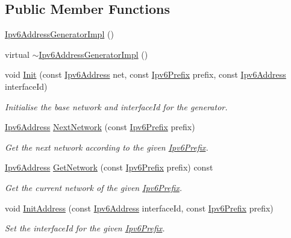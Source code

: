 \subsection*{Public Member Functions}
\begin{DoxyCompactItemize}
\item 
\hyperlink{classns3_1_1Ipv6AddressGeneratorImpl_a5a762f2352c92101ea9ed73d8a069538}{Ipv6\+Address\+Generator\+Impl} ()
\item 
virtual \hyperlink{classns3_1_1Ipv6AddressGeneratorImpl_a3e7f0c5fd87e520f553f9e95f7c546e9}{$\sim$\+Ipv6\+Address\+Generator\+Impl} ()
\item 
void \hyperlink{classns3_1_1Ipv6AddressGeneratorImpl_ac5137550d994e0da6b942210b9836bb6}{Init} (const \hyperlink{classns3_1_1Ipv6Address}{Ipv6\+Address} net, const \hyperlink{classns3_1_1Ipv6Prefix}{Ipv6\+Prefix} prefix, const \hyperlink{classns3_1_1Ipv6Address}{Ipv6\+Address} interface\+Id)
\begin{DoxyCompactList}\small\item\em Initialise the base network and interface\+Id for the generator. \end{DoxyCompactList}\item 
\hyperlink{classns3_1_1Ipv6Address}{Ipv6\+Address} \hyperlink{classns3_1_1Ipv6AddressGeneratorImpl_a9ff78bd07b2d61baa067144e44165dc3}{Next\+Network} (const \hyperlink{classns3_1_1Ipv6Prefix}{Ipv6\+Prefix} prefix)
\begin{DoxyCompactList}\small\item\em Get the next network according to the given \hyperlink{classns3_1_1Ipv6Prefix}{Ipv6\+Prefix}. \end{DoxyCompactList}\item 
\hyperlink{classns3_1_1Ipv6Address}{Ipv6\+Address} \hyperlink{classns3_1_1Ipv6AddressGeneratorImpl_af9484b367b8c08c97436f23a9dd7cd82}{Get\+Network} (const \hyperlink{classns3_1_1Ipv6Prefix}{Ipv6\+Prefix} prefix) const 
\begin{DoxyCompactList}\small\item\em Get the current network of the given \hyperlink{classns3_1_1Ipv6Prefix}{Ipv6\+Prefix}. \end{DoxyCompactList}\item 
void \hyperlink{classns3_1_1Ipv6AddressGeneratorImpl_ac96e9cab561abf1f94544dd535a36520}{Init\+Address} (const \hyperlink{classns3_1_1Ipv6Address}{Ipv6\+Address} interface\+Id, const \hyperlink{classns3_1_1Ipv6Prefix}{Ipv6\+Prefix} prefix)
\begin{DoxyCompactList}\small\item\em Set the interface\+Id for the given \hyperlink{classns3_1_1Ipv6Prefix}{Ipv6\+Prefix}. \end{DoxyCompactList}\item 

\end{DoxyCompactItemize}
